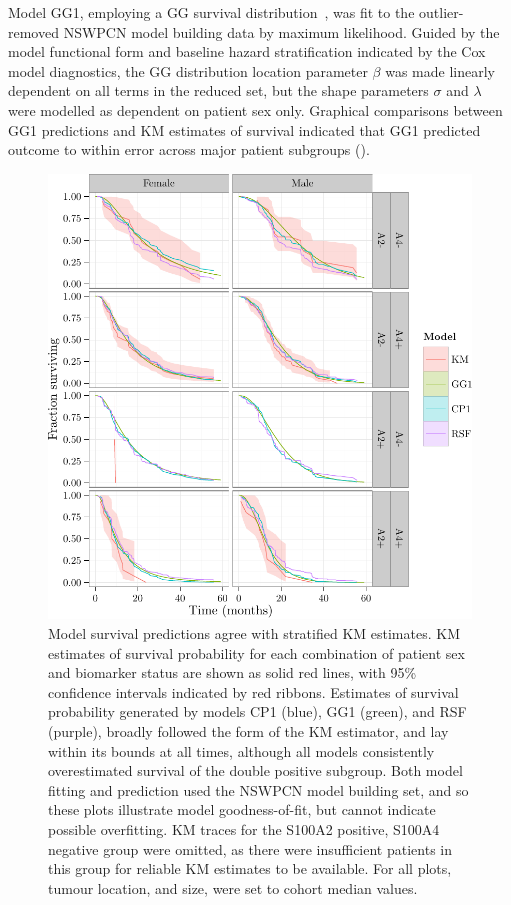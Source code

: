 \documentclass[dissertation.tex]{subfiles}
\begin{document}
Model GG1, employing a \gls{GG} survival distribution~\cite{Cox2007}, was fit to the outlier-removed \gls{NSWPCN} model building data by maximum likelihood.  Guided by the model functional form and baseline hazard stratification indicated by the Cox model diagnostics, the \gls{GG} distribution location parameter $\beta$ was made linearly dependent on all terms in the reduced set, but the shape parameters $\sigma$ and $\lambda$ were modelled as dependent on patient sex only.  Graphical comparisons between GG1 predictions and \gls{KM} estimates of survival indicated that GG1 predicted outcome to within error across major patient subgroups ().

\begin{figure}[!htbp]
\centering
  \includegraphics[width=.85\linewidth]{analysis/nomogram/figure/05-final-fit-assessment-2}
  \caption[Model survival predictions agree with stratified \texorpdfstring{\acrshort{KM}}{KM} estimates]{Model survival predictions agree with stratified \gls{KM} estimates.  \gls{KM} estimates of survival probability for each combination of patient sex and biomarker status are shown as solid red lines, with 95\% confidence intervals indicated by red ribbons.  Estimates of survival probability generated by models CP1 (blue), GG1 (green), and RSF (purple), broadly followed the form of the \gls{KM} estimator, and lay within its bounds at all times, although all models consistently overestimated survival of the double positive subgroup.  Both model fitting and prediction used the \gls{NSWPCN} model building set, and so these plots illustrate model goodness-of-fit, but cannot indicate possible overfitting.  \gls{KM} traces for the S100A2 positive, S100A4 negative group were omitted, as there were insufficient patients in this group for reliable \gls{KM} estimates to be available.  For all plots, tumour location, and size, were set to cohort median values.}
\label{fig:nomo-cp1-gg1-fitplot}
\end{figure}
\end{document}
